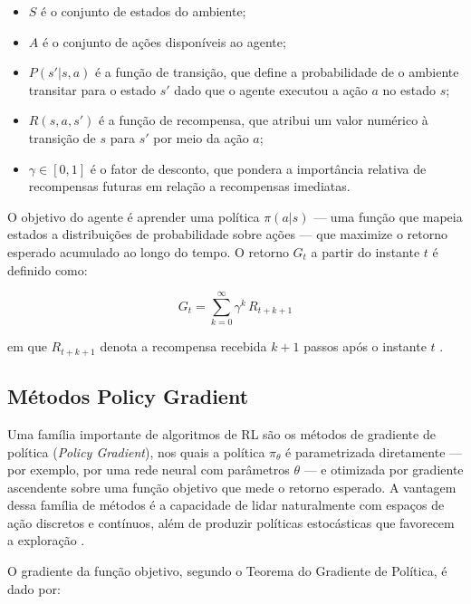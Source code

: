 \begin{itemize}
    \item $S$ é o conjunto de estados do ambiente;
    \item $A$ é o conjunto de ações disponíveis ao agente;
    \item $P(s' | s, a)$ é a função de transição, que define a probabilidade
          de o ambiente transitar para o estado $s'$ dado que o agente executou
          a ação $a$ no estado $s$;
    \item $R(s, a, s')$ é a função de recompensa, que atribui um valor
          numérico à transição de $s$ para $s'$ por meio da ação $a$;
    \item $\gamma \in [0, 1]$ é o fator de desconto, que pondera a importância
          relativa de recompensas futuras em relação a recompensas imediatas.
\end{itemize}

O objetivo do agente é aprender uma política $\pi(a|s)$ --- uma função que
mapeia estados a distribuições de probabilidade sobre ações --- que maximize o
retorno esperado acumulado ao longo do tempo. O retorno $G_t$ a partir do
instante $t$ é definido como:

\begin{equation}
    G_t = \sum_{k=0}^{\infty} \gamma^k \, R_{t+k+1}
    \label{eq:retorno}
\end{equation}

\noindent em que $R_{t+k+1}$ denota a recompensa recebida $k+1$ passos após o
instante $t$ \cite{sutton2018reinforcement}.

\subsection{Métodos Policy Gradient}
\label{subsec:policy-gradient}

Uma família importante de algoritmos de RL são os métodos de gradiente de
política (\textit{Policy Gradient}), nos quais a política $\pi_\theta$ é
parametrizada diretamente --- por exemplo, por uma rede neural com parâmetros
$\theta$ --- e otimizada por gradiente ascendente sobre uma função objetivo
que mede o retorno esperado. A vantagem dessa família de métodos é a
capacidade de lidar naturalmente com espaços de ação discretos e contínuos,
além de produzir políticas estocásticas que favorecem a exploração
\cite{sutton2018reinforcement}.

O gradiente da função objetivo, segundo o Teorema do Gradiente de Política, é
dado por:

